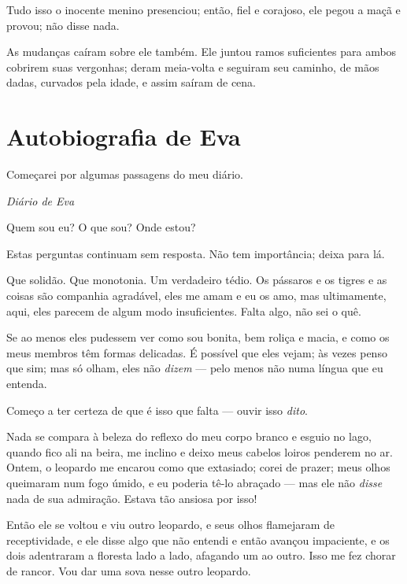 Tudo isso o inocente menino presenciou; então, fiel e corajoso, ele
pegou a maçã e provou; não disse nada.

As mudanças caíram sobre ele também. Ele juntou ramos suficientes
para ambos cobrirem suas vergonhas; deram meia-volta e seguiram seu
caminho, de mãos dadas, curvados pela idade, e assim saíram de cena.


\chapter{Autobiografia de Eva}

\sectionitem

\begin{center}
Começarei por algumas passagens do meu diário.
\end{center}

\begin{center}
\textit{Diário de Eva}
\end{center}


 Quem sou eu? O que sou? Onde estou?

 Estas perguntas continuam sem resposta. Não tem importância; deixa para lá.

 Que solidão. Que monotonia. Um verdadeiro tédio. Os pássaros e os tigres
e as coisas são companhia agradável, eles me amam e eu os amo, mas ultimamente, aqui, eles parecem
de algum modo insuficientes. Falta algo, não sei o quê.

Se ao menos eles pudessem ver como sou bonita, bem roliça e macia, e como os
meus membros têm formas delicadas. É possível que eles vejam; às vezes penso que sim; mas só
olham, eles não \textit{dizem} --- pelo menos não numa língua que eu entenda.

Começo a ter certeza de que é isso que falta --- ouvir isso \textit{dito}.

 Nada se compara à beleza do reflexo do meu corpo branco e esguio no lago,
quando fico ali na beira, me inclino e deixo meus cabelos loiros penderem no ar.
Ontem, o leopardo me encarou como que extasiado; corei de prazer;
meus olhos queimaram num fogo úmido, e eu poderia tê-lo abraçado --- mas ele não \textit{disse}
nada de sua admiração. Estava tão ansiosa por isso!

Então ele se voltou e viu outro leopardo, e seus olhos flamejaram de receptividade, e ele
disse algo que não entendi e então avançou impaciente, e os dois adentraram a floresta
lado a lado, afagando um ao outro. Isso me fez chorar de rancor.
Vou dar uma sova nesse outro leopardo.

